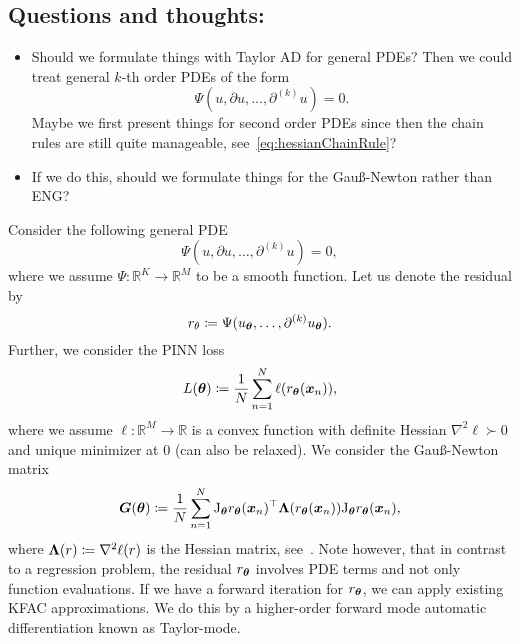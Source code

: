 \subsection{Questions and thoughts:}

\begin{itemize}
    \item Should we formulate things with Taylor AD for general PDEs? Then we could treat general $k$-th order PDEs of the form     
    \begin{equation*}
        \Psi(u, \partial u, \dots, \partial^{(k)} u) = 0. 
    \end{equation*}
    Maybe we first present things for second order PDEs since then the chain rules are still quite manageable, see~\eqref{eq:hessianChainRule}? 
    \item If we do this, should we formulate things for the Gauß-Newton rather than ENG?
\end{itemize}

Consider the following general PDE
\begin{equation}
    \Psi(u, \partial u, \dots, \partial^{(k)} u) = 0,
\end{equation}
where we assume $\Psi\colon \mathbb R^K\to\mathbb R^M$ to be a smooth function.
Let us denote the residual by 
\begin{equation}
    r_\theta\coloneqq \Psi(u_{\bm{\theta}}, \dots, \partial^{(k)} u_{\bm{\theta}}). 
\end{equation}
Further, we consider the PINN loss
\begin{equation}
    L({\bm{\theta}})\coloneqq \frac1N\sum_{n=1}^N \ell(r_{{\bm{\theta}}}({\bm{x}}_n)),
\end{equation}
where we assume $\ell\colon\mathbb R^M\to\mathbb R$ is a convex function with definite Hessian $\nabla^2\ell\succ0$ and unique minimizer at $0$ (can also be relaxed). 
We consider the Gauß-Newton matrix
\begin{equation}
    {\bm{G}}({\bm{\theta}}) \coloneqq \frac1N\sum_{n=1}^N \mathrm{J}_{\bm{\theta}} r_{\bm{\theta}}({\bm{x}}_n)^\top {\bm{\Lambda}}(r_{\bm{\theta}}({\bm{x}}_n)) \mathrm{J}_{\bm{\theta}} r_{\bm{\theta}}({\bm{x}}_n),
\end{equation}
where ${\bm{\Lambda}}(r)\coloneqq \nabla^2 \ell(r)$ is the Hessian matrix, see~\cite{eschenhagen2023kroneckerfactored}. 
Note however, that in contrast to a regression problem, the residual $r_{\bm{\theta}}$ involves PDE terms and not only function evaluations. 
If we have a forward iteration for $r_{\bm{\theta}}$, we can apply existing KFAC approximations. 
We do this by a higher-order forward mode automatic differentiation known as Taylor-mode. 

